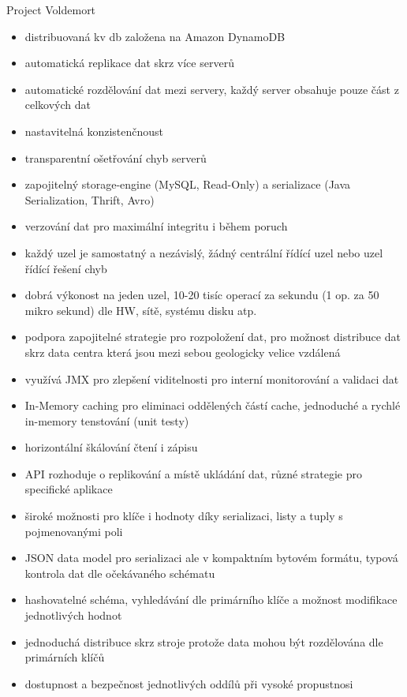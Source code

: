 \documentclass{article}
\begin{document}
	\begin{subsubsection}{Project Voldemort}
		\begin{itemize}
			\item distribuovaná kv db založena na Amazon DynamoDB
			\item automatická replikace dat skrz více serverů
			\item automatické rozdělování dat mezi servery, každý server obsahuje pouze část z celkových dat
			\item nastavitelná konzistenčnoust
			\item transparentní ošetřování chyb serverů
			\item zapojitelný storage-engine (MySQL, Read-Only) a serializace (Java Serialization, Thrift, Avro) 
			\item verzování dat pro maximální integritu i během poruch
			\item každý uzel je samostatný a nezávislý, žádný centrální řídící uzel nebo uzel řídící řešení chyb
			\item dobrá výkonost na jeden uzel, 10-20 tisíc operací za sekundu (1 op. za 50 mikro sekund) dle HW, sítě, systému disku atp.
			\item podpora zapojitelné strategie pro rozpoložení dat, pro možnost distribuce dat skrz data centra která jsou mezi sebou geologicky velice vzdálená
			\item využívá JMX pro zlepšení viditelnosti pro interní monitorování a validaci dat
			\item In-Memory caching pro eliminaci oddělených částí cache, jednoduché a rychlé in-memory tenstování (unit testy)
			\item horizontální škálování čtení i zápisu
			\item API rozhoduje o replikování a místě ukládání dat, různé strategie pro specifické aplikace
			\item široké možnosti pro klíče i hodnoty díky serializaci, listy a tuply s pojmenovanými poli
			\item JSON data model pro serializaci ale v kompaktním bytovém formátu, typová kontrola dat dle očekávaného schématu
			\item hashovatelné schéma, vyhledávání dle primárního klíče a možnost modifikace jednotlivých hodnot
			\item jednoduchá distribuce skrz stroje protože data mohou být rozdělována dle primárních klíčů
			\item dostupnost a bezpečnost jednotlivých oddílů při vysoké propustnosi
		\end{itemize}
	\end{subsubsection}
	
\end{document}
